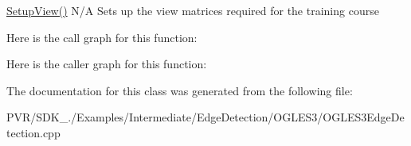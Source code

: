   \hyperlink{class_o_g_l_e_s3_edge_detection_a25890cacb4e3b9cd75193851fefda205}{Setup\+View()}  N/\+A  Sets up the view matrices required for the training course 

Here is the call graph for this function\+:




Here is the caller graph for this function\+:




The documentation for this class was generated from the following file\+:\begin{DoxyCompactItemize}
\item 
P\+V\+R/\+S\+D\+K\+\_./\+Examples/\+Intermediate/\+Edge\+Detection/\+O\+G\+L\+E\+S3/O\+G\+L\+E\+S3\+Edge\+Detection.\+cpp\end{DoxyCompactItemize}
